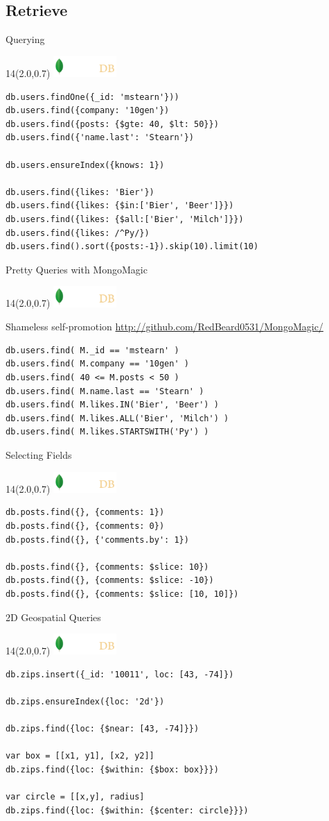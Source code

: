 \documentclass{beamer}
\newcommand{\MongoLogo}{
\begin{textblock}{14}(2.0,0.7)
  \includegraphics[height=0.8cm]{logo-mongodb-ondark.png}
\end{textblock}
}
\begin{document}
\subsection{Retrieve}
\begin{frame}[fragile]{Querying}
  \MongoLogo

  \begin{lstlisting}
db.users.findOne({_id: 'mstearn'}))
db.users.find({company: '10gen'})
db.users.find({posts: {$gte: 40, $lt: 50}}) 
db.users.find({'name.last': 'Stearn'})

db.users.ensureIndex({knows: 1})

db.users.find({likes: 'Bier'})
db.users.find({likes: {$in:['Bier', 'Beer']}})
db.users.find({likes: {$all:['Bier', 'Milch']}})
db.users.find({likes: /^Py/})
db.users.find().sort({posts:-1}).skip(10).limit(10)
  \end{lstlisting}
\end{frame}

\begin{frame}[fragile]{Pretty Queries with MongoMagic}
  \MongoLogo

  \begin{block}{Shameless self-promotion}
    \url{http://github.com/RedBeard0531/MongoMagic/}
  \end{block}

  \begin{lstlisting}
db.users.find( M._id == 'mstearn' )
db.users.find( M.company == '10gen' )
db.users.find( 40 <= M.posts < 50 ) 
db.users.find( M.name.last == 'Stearn' )
db.users.find( M.likes.IN('Bier', 'Beer') )
db.users.find( M.likes.ALL('Bier', 'Milch') )
db.users.find( M.likes.STARTSWITH('Py') )
  \end{lstlisting}
\end{frame}

\begin{frame}[fragile]{Selecting Fields}
  \MongoLogo

  \begin{lstlisting}
db.posts.find({}, {comments: 1})
db.posts.find({}, {comments: 0})
db.posts.find({}, {'comments.by': 1})

db.posts.find({}, {comments: $slice: 10})
db.posts.find({}, {comments: $slice: -10})
db.posts.find({}, {comments: $slice: [10, 10]})
  \end{lstlisting}
\end{frame}

\begin{frame}[fragile]{2D Geospatial Queries}
  \MongoLogo

  \small
  \begin{lstlisting}
db.zips.insert({_id: '10011', loc: [43, -74]})

db.zips.ensureIndex({loc: '2d'})

db.zips.find({loc: {$near: [43, -74]}})

var box = [[x1, y1], [x2, y2]]
db.zips.find({loc: {$within: {$box: box}}})

var circle = [[x,y], radius]
db.zips.find({loc: {$within: {$center: circle}}})
                 
  \end{lstlisting}
\end{frame}
\end{document}
